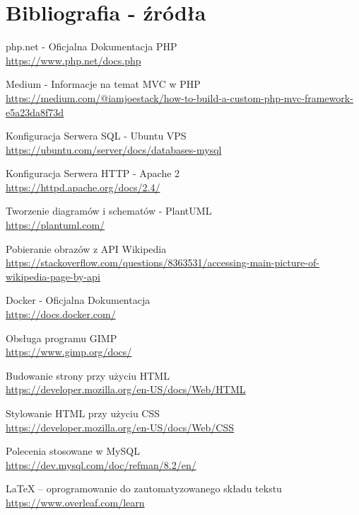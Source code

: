 
\section{Bibliografia - źródła }

\begin{thebibliography}{9}
    php.net - Oficjalna Dokumentacja PHP\\
    \url{https://www.php.net/docs.php}

    Medium - Informacje na temat MVC w PHP\\
    \url{https://medium.com/@iamjoestack/how-to-build-a-custom-php-mvc-framework-e5a23da8f73d}

    Konfiguracja Serwera SQL - Ubuntu VPS\\
    \url{https://ubuntu.com/server/docs/databases-mysql}


    Konfiguracja Serwera HTTP -  Apache 2\\
    \url{https://httpd.apache.org/docs/2.4/}

    Tworzenie diagramów i schematów - PlantUML\\
    \url{https://plantuml.com/}


    Pobieranie obrazów z API Wikipedia\\
    \url{https://stackoverflow.com/questions/8363531/accessing-main-picture-of-wikipedia-page-by-api}


    Docker - Oficjalna Dokumentacja\\
    \url{ https://docs.docker.com/}

    Obsługa programu GIMP\\
    \url{https://www.gimp.org/docs/}

    Budowanie strony przy użyciu HTML\\
    \url{https://developer.mozilla.org/en-US/docs/Web/HTML}

    Stylowanie HTML przy użyciu CSS\\
    \url{https://developer.mozilla.org/en-US/docs/Web/CSS}

    Polecenia stosowane w MySQL\\
    \url{https://dev.mysql.com/doc/refman/8.2/en/}

    LaTeX – oprogramowanie do zautomatyzowanego składu tekstu\\
    \url{https://www.overleaf.com/learn}


   
    
\end{thebibliography}
